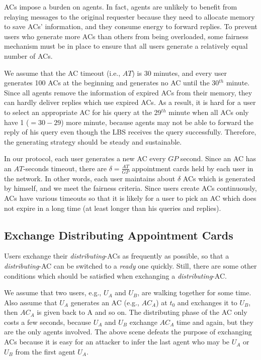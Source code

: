 ACs impose a burden on agents. In fact, agents are unlikely to benefit from relaying messages to the original requester because they need to allocate memory to save ACs' information, and they consume energy to forward replies. To prevent users who generate more ACs than others from being overloaded, some fairness mechanism must be in place to ensure that all users generate a relatively equal number of ACs.

We assume that the AC timeout (i.e., $AT$) is 30 minutes, and every user generates 100 ACs at the beginning and generates no AC until the 30${}^{th}$ minute. Since all agents remove the information of expired ACs from their memory, they can hardly deliver replies which use expired ACs. As a result, it is hard for a user to select an appropriate AC for his query at the 29${}^{th}$ minute when all ACs only have 1 ($=30-29$) more minute, because agents may not be able to forward the reply of his query even though the LBS receives the query successfully. Therefore, the generating strategy should be steady and sustainable.

In our protocol, each user generates a new AC every $GP$ second. Since an AC has an $AT$-seconds timeout, there are $\delta =\frac{AT}{GP}$ appointment cards held by each user in the network. In other words, each user maintains about $\delta$ ACs which is generated by himself, and we meet the fairness criteria. Since users create ACs continuously, ACs have various timeouts so that it is likely for a user to pick an AC which does not expire in a long time (at least longer than his queries and replies).


\subsection{ Exchange Distributing Appointment Cards}\label{subsec_ExchangeDisAptCrd}

\noindent Users exchange their \textit{distributing}-ACs as frequently as possible, so that a \textit{distributing}-AC can be switched to a \textit{ready} one quickly. Still, there are some other conditions which should be satisfied when exchanging a \textit{distributing}-AC.

We assume that two users, e.g., $U_A$ and $U_B$, are walking together for some time. Also assume that $U_A$ generates an AC (e.g., ${AC}_A$) at $t_0$ and exchanges it to $U_B$, then ${AC}_A$ is given back to A and so on. The distributing phase of the AC only costs a few seconds, because $U_A$ and $U_B$ exchange ${AC}_A$ time and again, but they are the only agents involved. The above scene defeats the purpose of exchanging ACs because it is easy for an attacker to infer the last agent who may be $U_A$ or $U_B$ from the first agent $U_A$. 

